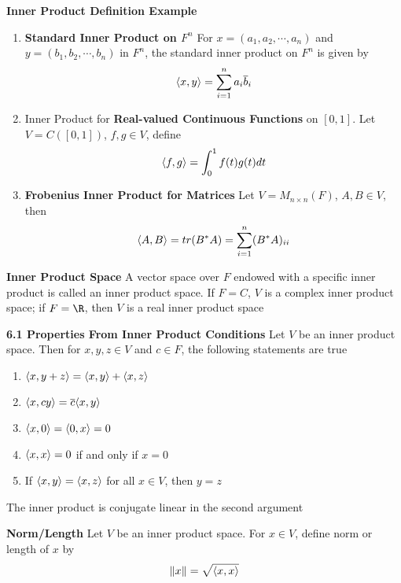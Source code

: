 \documentclass[11pt]{article}
\begin{document}
\begin{defn*}
    \textbf{Inner Product Definition Example}
    \begin{enumerate}
        \item \textbf{Standard Inner Product on $F^n$} For $x = (a_1,a_2,\cdots,a_n)$ and $y=(b_1,b_2,\cdots, b_n)$ in $F^n$, the standard inner product on $F^n$ is given by 
        \[
            \langle x,y\rangle = \sum_{i=1}^n a_i \overline{b}_i    
        \]
        \item Inner Product for \textbf{Real-valued Continuous Functions} on $[0,1]$. Let $V=C([0,1])$, $f,g\in V$, define 
        \[
            \langle f,g\rangle = \int_0^1 f(t) g(t) dt    
        \]
        \item \textbf{Frobenius Inner Product for Matrices} Let $V=M_{n\times n}(F)$, $A,B\in V$, then 
        \[
            \langle A,B\rangle = tr(B^*A) = \sum_{i=1}^n (B^*A)_{ii}
        \]
    \end{enumerate}
\end{defn*}

\begin{defn*}
    \textbf{Inner Product Space} A vector space over $F$ endowed with a specific inner product is called an inner product space. If $F=C$, $V$ is a complex inner product space; if $F=\R$, then $V$ is a real inner product space
\end{defn*}

\begin{theorem*}
    \textbf{6.1 Properties From Inner Product Conditions} Let $V$ be an inner product space. Then for $x,y,z\in V$ and $c\in F$, the following statements are true 
    \begin{enumerate}
        \item $\langle x,y+z\rangle = \langle x,y\rangle + \langle x,z\rangle$
        \item $\langle x,cy\rangle = \overline{c} \langle x,y\rangle$
        \item $\langle x,0\rangle = \langle0,x\rangle = 0$
        \item $\langle x,x\rangle = 0$ if and only if $x=0$ 
        \item If $\langle x,y\rangle = \langle x,z\rangle$ for all $x\in V$, then $y=z$
    \end{enumerate}
    The inner product is conjugate linear in the second argument 
\end{theorem*}

\begin{defn*}
    \textbf{Norm/Length} Let $V$ be an inner product space. For $x\in V$, define norm or length of $x$ by 
    \[
        \left\lVert x\right\rVert = \sqrt{\langle x,x\rangle}    
    \]
\end{defn*}
\end{document}
